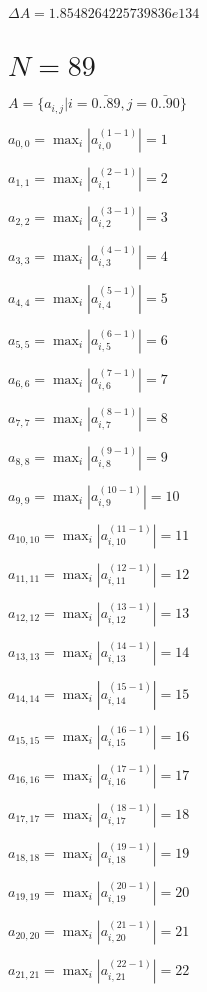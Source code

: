 \documentclass[a4paper,12pt]{article}
\begin{document}
$\Delta A = 1.8548264225739836e134$



\section{ $N = 89$ }
$A = \{ a _{ i, j } | i = \bar { 0..89 }, j = \bar { 0..90 } \}$

$a _{ 0, 0 } =  \max _i |a _{ i, 0 } ^{ (1 - 1) } | = 1$

$a _{ 1, 1 } =  \max _i |a _{ i, 1 } ^{ (2 - 1) } | = 2$

$a _{ 2, 2 } =  \max _i |a _{ i, 2 } ^{ (3 - 1) } | = 3$

$a _{ 3, 3 } =  \max _i |a _{ i, 3 } ^{ (4 - 1) } | = 4$

$a _{ 4, 4 } =  \max _i |a _{ i, 4 } ^{ (5 - 1) } | = 5$

$a _{ 5, 5 } =  \max _i |a _{ i, 5 } ^{ (6 - 1) } | = 6$

$a _{ 6, 6 } =  \max _i |a _{ i, 6 } ^{ (7 - 1) } | = 7$

$a _{ 7, 7 } =  \max _i |a _{ i, 7 } ^{ (8 - 1) } | = 8$

$a _{ 8, 8 } =  \max _i |a _{ i, 8 } ^{ (9 - 1) } | = 9$

$a _{ 9, 9 } =  \max _i |a _{ i, 9 } ^{ (10 - 1) } | = 10$

$a _{ 10, 10 } =  \max _i |a _{ i, 10 } ^{ (11 - 1) } | = 11$

$a _{ 11, 11 } =  \max _i |a _{ i, 11 } ^{ (12 - 1) } | = 12$

$a _{ 12, 12 } =  \max _i |a _{ i, 12 } ^{ (13 - 1) } | = 13$

$a _{ 13, 13 } =  \max _i |a _{ i, 13 } ^{ (14 - 1) } | = 14$

$a _{ 14, 14 } =  \max _i |a _{ i, 14 } ^{ (15 - 1) } | = 15$

$a _{ 15, 15 } =  \max _i |a _{ i, 15 } ^{ (16 - 1) } | = 16$

$a _{ 16, 16 } =  \max _i |a _{ i, 16 } ^{ (17 - 1) } | = 17$

$a _{ 17, 17 } =  \max _i |a _{ i, 17 } ^{ (18 - 1) } | = 18$

$a _{ 18, 18 } =  \max _i |a _{ i, 18 } ^{ (19 - 1) } | = 19$

$a _{ 19, 19 } =  \max _i |a _{ i, 19 } ^{ (20 - 1) } | = 20$

$a _{ 20, 20 } =  \max _i |a _{ i, 20 } ^{ (21 - 1) } | = 21$

$a _{ 21, 21 } =  \max _i |a _{ i, 21 } ^{ (22 - 1) } | = 22$
\end{document}
